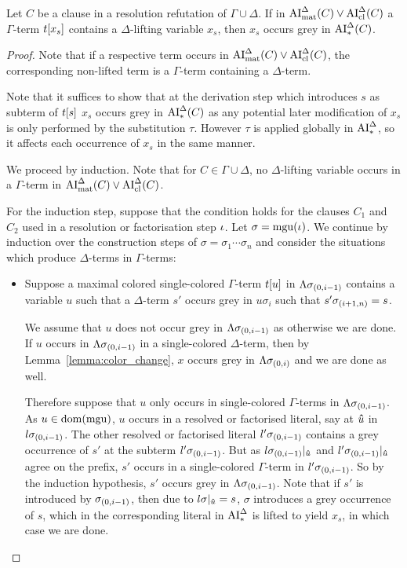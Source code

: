 \documentclass[,%
	draft=false,%
	numbers=noendperiod
	11pt,
	a4paper,
	oneside,%
	openany,
]{memoir}
\begin{document}
\begin{lemma}
	\label{lemma:lft_var_occurs_grey}
 	Let $C$ be a clause in a resolution refutation of $\Gamma \cup \Delta$.
	If in $\operatorname{AI}_\mathrm{mat}^\Delta(C) \lor \operatorname{AI}_\mathrm{cl}^\Delta(C)$	a $\Gamma$-term $t[x_s]$ contains a $\Delta$-lifting variable $x_s$, then $x_s$ occurs grey in $\operatorname{AI}_\mathrm{*}^\Delta(C)$.

\end{lemma}
\begin{proof}
	Note that if a respective term occurs in $\operatorname{AI}_\mathrm{mat}^\Delta(C) \lor \operatorname{AI}_\mathrm{cl}^\Delta(C)$, the corresponding non-lifted term is a $\Gamma$-term containing a $\Delta$-term.

	Note that it suffices to show that at the derivation step which introduces $s$ as subterm of $t[s]$ $x_s$ occurs grey in $\operatorname{AI}_\mathrm{*}^\Delta(C)$ as any potential later modification of $x_s$ is only performed by the substitution $\tau$. 
	However $\tau$ is applied globally in $\operatorname{AI}_\mathrm{*}^\Delta$, so it affects each occurrence of $x_s$ in the same manner.

	We proceed by induction.
	Note that for $C\in \Gamma\cup\Delta$, no $\Delta$-lifting variable occurs in a $\Gamma$-term in $\operatorname{AI}_\mathrm{mat}^\Delta(C) \lor \operatorname{AI}_\mathrm{cl}^\Delta(C)$.

	For the induction step, suppose that the condition holds for the clauses $C_1$ and $C_2$ used in a resolution or factorisation step $\iota$.
	Let $\sigma = \operatorname{mgu}(\iota)$.
	We continue by induction over the construction steps of $\sigma = \sigma_1 \cdots \sigma_n$ and consider the situations which produce $\Delta$-terms in $\Gamma$-terms:
	\begin{itemize}
		\item Suppose a maximal colored single-colored $\Gamma$-term $t[u]$ in $\Lambda\sigma_{(0,i-1)}$ contains a variable $u$ such that a $\Delta$-term $s'$ occurs grey in $u\sigma_i$ such that $s'\sigma_{(i+1,n)} = s$.

			We assume that $u$ does not occur grey in $\Lambda\sigma_{(0,i-1)}$ as otherwise we are done.
			If $u$ occurs in $\Lambda\sigma_{(0,i-1)}$ in a single-colored $\Delta$-term, then by Lemma~\ref{lemma:color_change}, $x$ occurs grey in $\Lambda\sigma_{(0,i)}$ and we are done as well.

			Therefore suppose that $u$ only occurs in single-colored $\Gamma$-terms in $\Lambda\sigma_{(0,i-1)}$.
			As $u\in\operatorname{dom}(\operatorname{mgu})$, $u$ occurs in a resolved or factorised literal, say at $\bm\hat u$ in $l\sigma_{(0,i-1)}$.
			The other resolved or factorised literal $l'\sigma_{(0,i-1)}$ contains a grey occurrence of $s'$ at the subterm $l'\sigma_{(0,i-1)}$.
			But as $l\sigma_{(0,i-1)}|_{\bm\hat u}$ and $l'\sigma_{(0,i-1)}|_{\bm\hat u}$ agree on the prefix, $s'$ occurs in a single-colored $\Gamma$-term in $l'\sigma_{(0,i-1)}$.
			So by the induction hypothesis, $s'$ occurs grey in $\Lambda\sigma_{(0,i-1)}$.
			Note that if $s'$ is introduced by $\sigma_{(0,i-1)}$, then due to $l\sigma|_{\bm\hat u} = s$, $\sigma$ introduces a grey occurrence of $s$, which in the corresponding literal in $\operatorname{AI}_\mathrm{*}^\Delta$ is lifted to yield $x_s$, in which case we are done.


\end{itemize}
\end{proof}
\end{document}
